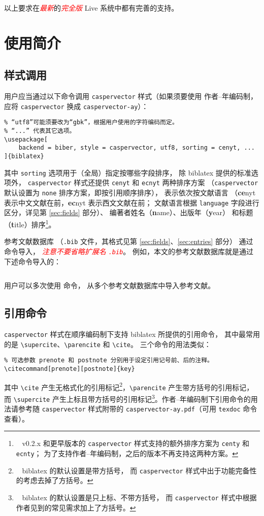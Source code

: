 \documentclass[UTF8]{ctexart}
\newcommand*{\cupercite}[1]{\supercite{#1}\mbox{}}
\newcommand{\myemph}[1]{\emph{\textcolor{red}{#1}}}
\begin{document}
以上要求在\myemph{最新}的\myemph{完全版}
 Live 系统中都有完善的支持。

\section{使用简介}
\subsection{样式调用}

用户应当通过以下命令调用 \verb|caspervector| 样式（如果须要使用
作者--年编码制，应将 \verb|caspervector| 换成 \verb|caspervector-ay|）：
\begin{Verbatim}
% “utf8”可能须要改为“gbk”，根据用户使用的字符编码而定。
% “...” 代表其它选项。
\usepackage[
	backend = biber, style = caspervector, utf8, sorting = cenyt, ...
]{biblatex}
\end{Verbatim}
其中 \verb|sorting| 选项用于（全局）指定按哪些字段排序，
除 biblatex 提供的标准选项\cupercite{biblatex}外，%
\verb|caspervector| 样式还提供 \verb|cenyt| 和 \verb|ecnyt| 两种排序方案
（\verb|caspervector| 默认设置为 \verb|none| 排序方案，即按引用顺序排序），
表示依次按文献语言
（\textbf{ce}nyt 表示中文文献在前，\textbf{ec}nyt 表示西文文献在前；
文献语言根据 \verb|language| 字段进行区分，详见第 \ref{sec:fields} 部分）、
编著者姓名（\textbf{n}ame）、出版年（\textbf{y}ear）
和标题（\textbf{t}itle）排序\footnote{\ %
	v0.2.x 和更早版本的 \texttt{caspervector}
	样式支持的额外排序方案为 \texttt{centy} 和 \texttt{ecnty}；
	为了支持作者--年编码制，之后的版本不再支持这两种方案。%
}。

参考文献数据库
（\verb|.bib| 文件，其格式见第 \ref{sec:fields}、\ref{sec:entries} 部分）
通过 \verb|| 命令导入，%
\myemph{注意不要省略扩展名 \texttt{.bib}}。
例如，本文的参考文献数据库就是通过下述命令导入的：
\begin{Verbatim}

\end{Verbatim}
用户可以多次使用 \verb|| 命令，
从多个参考文献数据库中导入参考文献。

\subsection{引用命令}

\verb|caspervector| 样式在顺序编码制下支持 biblatex 所提供的引用命令，
其中最常用的是 \verb|\supercite|、\verb|\parencite| 和 \verb|\cite|。
三个命令的用法类似：
\begin{Verbatim}
% 可选参数 prenote 和 postnote 分别用于设定引用记号前、后的注释。
\citecommand[prenote][postnote]{key}
\end{Verbatim}
其中 \verb|\cite| 产生无格式化的引用标记\footnote{\ %
	biblatex 的默认设置是带方括号，
	而 \texttt{caspervector} 样式中出于功能完备性的考虑去掉了方括号。%
}，\verb|\parencite| 产生带方括号的引用标记，
而 \verb|\supercite| 产生上标且带方括号的引用标记\footnote{\ %
	biblatex 的默认设置是只上标、不带方括号，
	而 \texttt{caspervector} 样式中根据作者见到的常见需求加上了方括号。%
}。作者--年编码制下引用命令的用法请参考随 \verb|caspervector|
样式附带的 \verb|caspervector-ay.pdf|（可用 \verb|texdoc| 命令查看）。
\end{document}
